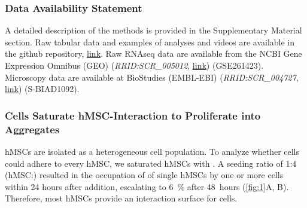 
\subsubsection*{Data Availability Statement}
A detailed description of the methods is provided in the Supplementary Material section. Raw
tabular data and examples of analyses and videos are available in the github repository, \href{https://github.com/markur4/Supplemental-INA-6-Subpopulations-and-Aggregation-Detachment-Dynamics}{link}.
Raw RNAseq data are available from the NCBI Gene Expression Omnibus (GEO)
(\textit{RRID:SCR\_005012}, \href{https://www.ncbi.nlm.nih.gov/geo/query/acc.cgi?acc=GSE261423}{link}) (GSE261423). Microscopy data are available at BioStudies
(EMBL-EBI) (\textit{RRID:SCR\_004727}, \href{https://www.ebi.ac.uk/biostudies/bioimages/studies/S-BIAD1092?key=69bafe9c-74ff-492b-9e68-bd42655c4d1b}{link}) (S-BIAD1092).

\newpage







\label{C1:results}



\subsubsection*{\INA Cells Saturate hMSC-Interaction to Proliferate into Aggregates}
hMSCs are isolated as a heterogeneous cell population. To analyze whether \INA
cells could adhere to every hMSC, we saturated hMSCs with \INA. A seeding ratio
of 1:4 (hMSC:\INA) resulted in the occupation of 
of single hMSCs by one or more \INA cells within 24 hours after \INA addition,
escalating to \SI{6}{\percent} after \SI{48}{hours} (\autoref{fig:1}A, B).
Therefore, most hMSCs provide an interaction surface for \INA cells.

